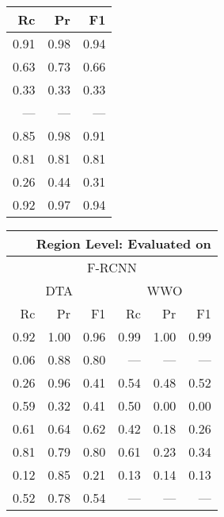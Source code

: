 {\begin{center}
\begin{tabular}[t]{rrr}
                  Rc   & Pr   & F1   \\
      \midrule
      \rowcolor{LightCyan}
                  0.91 & 0.98 & 0.94 \\
                  0.63 & 0.73 & 0.66 \\
      \rowcolor{LightCyan}      
                  0.33 & 0.33 & 0.33 \\
                  ---  & ---  & ---  \\
      \rowcolor{LightCyan}      
                  0.85 & 0.98 & 0.91 \\
                  0.81 & 0.81 & 0.81 \\
      \rowcolor{LightCyan}      
                  0.26 & 0.44 & 0.31 \\
                  0.92 & 0.97 & 0.94 \\
      \bottomrule
    \end{tabular}%
    \hspace{1em}%
    \begin{tabular}[t]{rrr|rrr}
      \multicolumn{6}{r}{\scriptsize Region Level: Evaluated on\!} \\[.2em]
      \toprule
      \multicolumn{6}{c}{F-RCNN} \\
      \multicolumn{3}{c}{DTA} & \multicolumn{3}{c}{WWO} \\
      Rc &   Pr &   F1 &   Rc &   Pr &   F1 \\
      \midrule
      \rowcolor{LightCyan}
      0.92 & 1.00 & 0.96 & 0.99 & 1.00 & 0.99 \\
      0.06 & 0.88 & 0.80 &  --- &  --- &  --- \\
      \rowcolor{LightCyan}
      0.26 & 0.96 & 0.41 & 0.54 & 0.48 & 0.52 \\
      0.59 & 0.32 & 0.41 & 0.50 & 0.00 & 0.00 \\
      \rowcolor{LightCyan}
      0.61 & 0.64 & 0.62 & 0.42 & 0.18 & 0.26 \\
      0.81 & 0.79 & 0.80 & 0.61 & 0.23 & 0.34 \\
      \rowcolor{LightCyan}
      0.12 & 0.85 & 0.21 & 0.13 & 0.14 & 0.13 \\
      0.52 & 0.78 & 0.54 &  --- & ---  &  --- \\

\end{tabular}
\end{center}}
